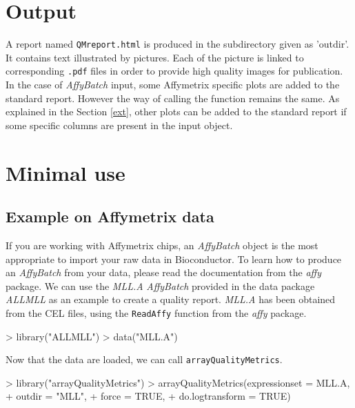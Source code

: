 \documentclass[a4paper]{article}
\newcommand{\Rpackage}[1]{\textit{#1}}
\newcommand{\Rclass}[1]{\textit{#1}}
\newcommand{\Rfunction}[1]{{\small\texttt{#1}}}
\begin{document}
\section{Output}
A report named \texttt{QMreport.html} is produced in the subdirectory given as 'outdir'. It contains text illustrated by pictures. Each of the picture is linked to corresponding \texttt{.pdf} files in order to provide high quality images for publication. In the case of \Rclass{AffyBatch} input, some Affymetrix specific plots are added to the standard report. However the way of calling the function remains the same. As explained in the Section \ref{ext}, other plots can be added to the standard report if some specific columns are present in the input object.

\section{Minimal use}
%
%

\subsection{Example on Affymetrix data}
If you are working with Affymetrix chips, an \Rclass{AffyBatch} object is the most appropriate to import your raw data in Bioconductor. To learn how to produce an \Rclass{AffyBatch} from your data, please read the documentation from the \Rpackage{affy} package. 
We can use the \emph{MLL.A} \Rclass{AffyBatch} provided in the data package \Rpackage{ALLMLL} as an example to create a quality report. \emph{MLL.A} has been obtained from the CEL files, using the \Rfunction{ReadAffy} function from the \Rpackage{affy} package.

%
\begin{Schunk}
\begin{Sinput}
> library("ALLMLL")
> data("MLL.A")
\end{Sinput}
\end{Schunk}

Now that the data are loaded, we can call \Rfunction{arrayQualityMetrics}.

%
\begin{Schunk}
\begin{Sinput}
> library("arrayQualityMetrics")
> arrayQualityMetrics(expressionset = MLL.A,
+                     outdir = "MLL",
+                     force = TRUE,
+                     do.logtransform = TRUE)
\end{Sinput}
\end{Schunk}
%
\end{document}
